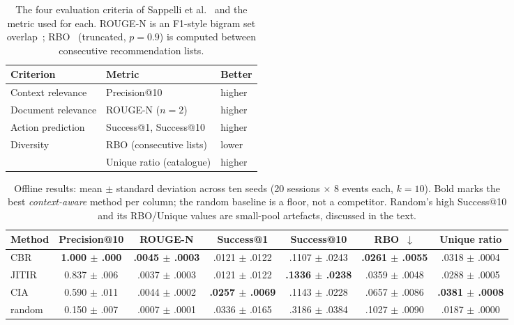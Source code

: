 \documentclass[acmlarge]{acmart}
\begin{document}
\begin{table}[t]
  \caption{The four evaluation criteria of Sappelli et
  al.~\cite{sappelli2017} and the metric used for each. ROUGE-N is an
  F1-style bigram set overlap~\cite{lin2004rouge}; RBO~\cite{webber2010rbo}
  (truncated, $p{=}0.9$) is computed between consecutive recommendation
  lists.}
  \label{tab:metric-map}
  \begin{tabular}{lll}
    \toprule
    Criterion & Metric & Better \\
    \midrule
    Context relevance  & Precision@10                 & higher \\
    Document relevance & ROUGE-N ($n{=}2$)~\cite{lin2004rouge} & higher \\
    Action prediction  & Success@1, Success@10        & higher \\
    Diversity          & RBO (consecutive lists)      & lower  \\
                       & Unique ratio (catalogue)     & higher \\
    \bottomrule
  \end{tabular}
\end{table}

\begin{table}[t]
  \caption{Offline results: mean $\pm$ standard deviation across ten seeds
  (20 sessions $\times$ 8 events each, $k{=}10$). Bold marks the best
  \emph{context-aware} method per column; the random baseline is a floor,
  not a competitor. Random's high Success@10 and its RBO/Unique values are
  small-pool artefacts, discussed in the text.}
  \label{tab:offline}
  \begin{tabular}{lcccccc}
    \toprule
    Method & Precision@10 & ROUGE-N & Success@1 & Success@10 & RBO~$\downarrow$ & Unique ratio \\
    \midrule
    CBR    & \textbf{1.000 $\pm$ .000} & \textbf{.0045 $\pm$ .0003} & .0121 $\pm$ .0122 & .1107 $\pm$ .0243 & \textbf{.0261 $\pm$ .0055} & .0318 $\pm$ .0004 \\
    JITIR  & 0.837 $\pm$ .006          & .0037 $\pm$ .0003 & .0121 $\pm$ .0122 & \textbf{.1336 $\pm$ .0238} & .0359 $\pm$ .0048          & .0288 $\pm$ .0005 \\
    CIA    & 0.590 $\pm$ .011          & .0044 $\pm$ .0002 & \textbf{.0257 $\pm$ .0069} & .1143 $\pm$ .0228 & .0657 $\pm$ .0086 & \textbf{.0381 $\pm$ .0008} \\
    \midrule
    random & 0.150 $\pm$ .007          & .0007 $\pm$ .0001 & .0336 $\pm$ .0165 & .3186 $\pm$ .0384 & .1027 $\pm$ .0090          & .0187 $\pm$ .0000 \\
    \bottomrule
  \end{tabular}
\end{table}
\end{document}
